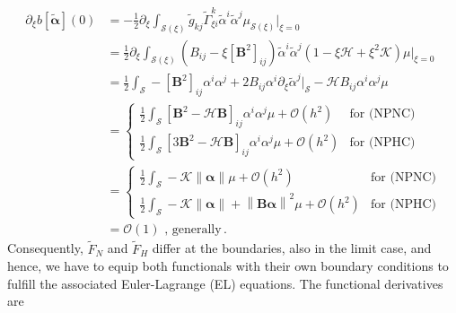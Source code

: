 \documentclass[a4paper,10pt]{scrartcl}
\newcommand{\surf}{\mathcal{S}}
\newcommand{\landau}{\mathcal{O}}
\newcommand{\tg}{\tilde{g}}
\newcommand{\Bb}{\mathbf{B}}
\newcommand{\alphab}{\bm{\alpha}}
\newcommand{\talphab}{\tilde{\alphab}}
\newcommand{\talpha}{\tilde{\alpha}}
\newcommand{\tF}{\tilde{F}}
\newcommand{\tch}[2]{\widetilde{\Gamma}_{#1}^{#2}}
\newcommand{\meanc}{\mathcal{H}}
\newcommand{\gaussc}{\mathcal{K}}
\newcommand{\formPeriod}{\,\text{.}}
\begin{document}
    \begin{align}
      \partial_{\xi}  b\left[ \talphab \right]\left( 0 \right) 
            &=  -\frac{1}{2}\partial_{\xi}  \int_{\surf(\xi)} \tg_{kj}\tch{\xi i}{k} \talpha^{i}\talpha^{j} \mu_{\surf(\xi)}\Big|_{\xi=0} \\
            &= \frac{1}{2}\partial_{\xi} \int_{\surf(\xi)}\left( B_{ij} - \xi\left[ \Bb^{2} \right]_{ij} \right) \talpha^{i}\talpha^{j} \left( 1 - \xi\meanc + \xi^{2}\gaussc\right)\mu\Big|_{\xi=0}\\
            &=  \frac{1}{2} \int_{\surf} -\left[ \Bb^{2} \right]_{ij}\alpha^{i}\alpha^{j} 
                                         +2B_{ij}\alpha^{i}\partial_{\xi}\talpha^{j}\big|_{\surf}
                                         -\meanc B_{ij}\alpha^{i}\alpha^{j} \mu \\
            &=              
              \begin{cases}
                 \frac{1}{2} \int_{\surf} \left[ \Bb^{2} - \meanc\Bb \right]_{ij}\alpha^{i}\alpha^{j} \mu + \landau(h^{2}) & \text{for (NPNC)} \\
                  \frac{1}{2} \int_{\surf} \left[ 3\Bb^{2} - \meanc\Bb \right]_{ij}\alpha^{i}\alpha^{j} \mu + \landau(h^{2}) & \text{for (NPHC)}
              \end{cases}\\
             &=
              \begin{cases}
                \frac{1}{2} \int_{\surf} -\gaussc\left\| \alphab \right\| \mu + \landau(h^{2}) & \text{for (NPNC)} \\
                \frac{1}{2} \int_{\surf} -\gaussc\left\| \alphab \right\| + \left\| \Bb\alphab \right\|^{2}\mu + \landau(h^{2}) & \text{for (NPHC)}
              \end{cases} \\
             &= \landau(1) \text{ , generally}
            \formPeriod
    \end{align}
    Consequently, \( \tF_{N} \) and \( \tF_{H} \) differ at the boundaries, also in the limit case, and hence, 
    we have to equip both functionals with their own boundary conditions to fulfill the associated Euler-Lagrange (EL) equations.
    The functional derivatives are
\end{document}
